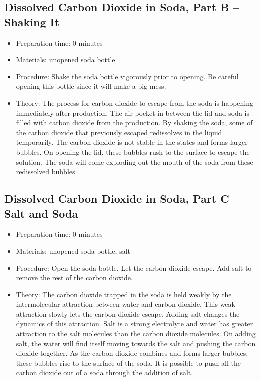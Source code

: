 \subsection{Dissolved Carbon Dioxide in Soda, Part B -- Shaking It}
\begin{itemize}
\item{Preparation time: 0 minutes}
\item{Materials: unopened soda bottle}
\item{Procedure: Shake the soda bottle vigorously prior to opening. Be careful opening this bottle since it will make a big mess.}
\item{Theory: The process for carbon dioxide to escape from the soda is happening immediately after production. The air pocket in between the lid and soda is filled with carbon dioxide from the production. By shaking the soda, some of the carbon dioxide that previously escaped redissolves in the liquid temporarily. The carbon dioxide is not stable in the states and forms larger bubbles. On opening the lid, these bubbles rush to the surface to escape the solution. The soda will come exploding out the mouth of the soda from these redissolved bubbles.}
\end{itemize}

\subsection{Dissolved Carbon Dioxide in Soda, Part C -- Salt and Soda}
\begin{itemize}
\item{Preparation time: 0 minutes}
\item{Materials: unopened soda bottle, salt}
\item{Procedure: Open the soda bottle. Let the carbon dioxide escape. Add salt to remove the rest of the carbon dioxide.}
\item{Theory: The carbon dioxide trapped in the soda is held weakly by the intermolecular attraction between water and carbon dioxide. This weak attraction slowly lets the carbon dioxide escape. Adding salt changes the dynamics of this attraction. Salt is a strong electrolyte and water has greater attraction to the salt molecules than the carbon dioxide molecules. On adding salt, the water will find itself moving towards the salt and pushing the carbon dioxide together. As the carbon dioxide combines and forms larger bubbles, these bubbles rise to the surface of the soda. It is possible to push all the carbon dioxide out of a soda through the addition of salt.}
\end{itemize}

